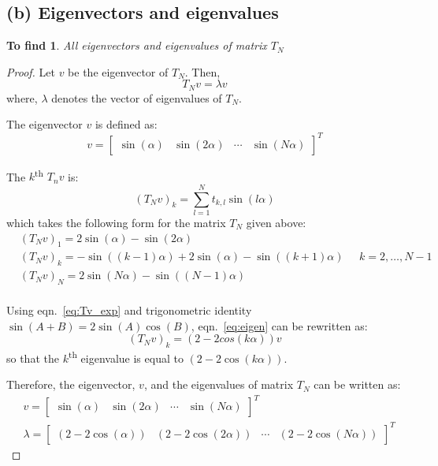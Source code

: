 \documentclass[11pt, oneside]{article}
\newtheorem*{remark}{To find}
\begin{document}
\subsection{(b) Eigenvectors and eigenvalues}
  \begin{remark}
      All eigenvectors and eigenvalues of matrix $T_N$
  \end{remark}
  \begin{proof}
    Let $v$ be the eigenvector of $T_N$. Then,
    \begin{equation}\label{eq:eigen}
      T_N v=\lambda v
    \end{equation}
    where, $\lambda$ denotes the vector of eigenvalues of $T_N$.

    The eigenvector $v$ is defined as:
    \begin{equation}
      v = \begin{bmatrix}
        \sin(\alpha) & \sin(2\alpha) & \cdots & \sin(N \alpha)
    \end{bmatrix}^T
    \end{equation}

    The $k$\textsuperscript{th} $T_n v$ is:
    \begin{equation}
      (T_N v )_k = \sum_{l=1}^{N} t_{k,l}\sin(l\alpha)
    \end{equation}
    which takes the following form for the matrix $T_N$ given above:
    \begin{align}\label{eq:Tv_exp}
      &(T_N v)_1 = 2 \sin(\alpha) -\sin(2\alpha) \\
      &(T_N v)_k = -\sin((k-1)\alpha) + 2 \sin(\alpha) -\sin((k+1)\alpha) \mspace{25mu} k = 2, \dots, N-1\\
      &(T_N v)_N = 2 \sin(N\alpha) -\sin((N-1)\alpha) \\
    \end{align}

    Using eqn.~\eqref{eq:Tv_exp} and trigonometric identity $\sin(A+B) = 2\sin(A)\cos(B)$, eqn.~\eqref{eq:eigen} can be rewritten as:
    \begin{equation}
      (T_N v)_k = \left(2 -2 cos(k\alpha) \right) v
    \end{equation}
    so that the $k$\textsuperscript{th} eigenvalue is equal to $(2 - 2\cos(k\alpha))$.

    Therefore, the eigenvector, $v$, and the eigenvalues of matrix $T_N$ can be written as:
    \begin{align}
      &v = \begin{bmatrix}
        \sin(\alpha) & \sin(2\alpha) & \cdots & \sin(N \alpha)
    \end{bmatrix}^T \\
      &\lambda = \begin{bmatrix}
        (2 - 2\cos(\alpha)) & (2 - 2\cos(2\alpha)) & \cdots & (2 - 2\cos(N\alpha))
    \end{bmatrix}^T
    \end{align} \qedhere
  \end{proof}
\end{document}
